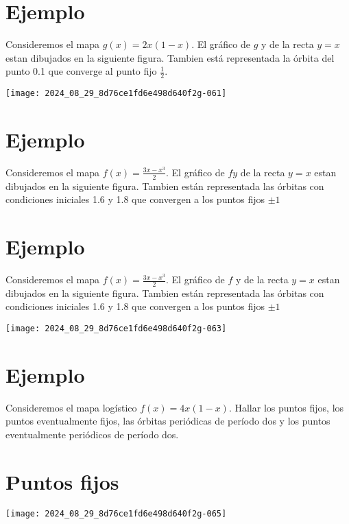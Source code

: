\documentclass[11pt]{beamer}
\begin{document}
\section*{Ejemplo}
Consideremos el mapa $g(x)=2 x(1-x)$. El gráfico de $g$ y de la recta $y=x$ estan dibujados en la siguiente figura. Tambien está representada la órbita del punto 0.1 que converge al punto fijo $\frac{1}{2}$.

\begin{center}
\texttt{[image: 2024\_08\_29\_8d76ce1fd6e498d640f2g-061]}
\end{center}

\section*{Ejemplo}
Consideremos el mapa $f(x)=\frac{3 x-x^{3}}{2}$. El gráfico de $f y$ de la recta $y=x$ estan dibujados en la siguiente figura. Tambien están representada las órbitas con condiciones iniciales 1.6 y 1.8 que convergen a los puntos fijos $\pm 1$

\section*{Ejemplo}
Consideremos el mapa $f(x)=\frac{3 x-x^{3}}{2}$. El gráfico de $f$ y de la recta $y=x$ estan dibujados en la siguiente figura. Tambien están representada las órbitas con condiciones iniciales 1.6 y 1.8 que convergen a los puntos fijos $\pm 1$

\begin{center}
\texttt{[image: 2024\_08\_29\_8d76ce1fd6e498d640f2g-063]}
\end{center}

\section*{Ejemplo}
Consideremos el mapa logístico $f(x)=4 x(1-x)$. Hallar los puntos fijos, los puntos eventualmente fijos, las órbitas periódicas de período dos y los puntos eventualmente periódicos de período dos.

\section*{Puntos fijos}
\begin{center}
\texttt{[image: 2024\_08\_29\_8d76ce1fd6e498d640f2g-065]}
\end{center}
\end{document}
